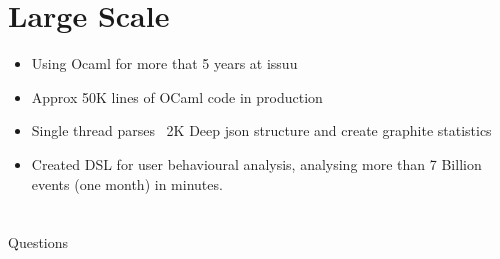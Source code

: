 \documentclass[mathserif,xcolor=svgnames]{beamer}
\renewcommand{\_}{\mathunderscore}
\begin{document}
\section{Large Scale}
\begin{frame}[fragile]
  \begin{itemize}
  \item Using Ocaml for more that 5 years at issuu
  \item Approx 50K lines of OCaml code in production
  \item Single thread parses ~2K Deep json structure and create
    graphite statistics
  \item Created DSL for user behavioural analysis, analysing more than
    7 Billion events (one month) in minutes.
  \end{itemize}
\end{frame}

\section{}
\begin{frame}[fragile]
  \begin{center}
    \LARGE Questions
  \end{center}
\end{frame}
\end{document}
